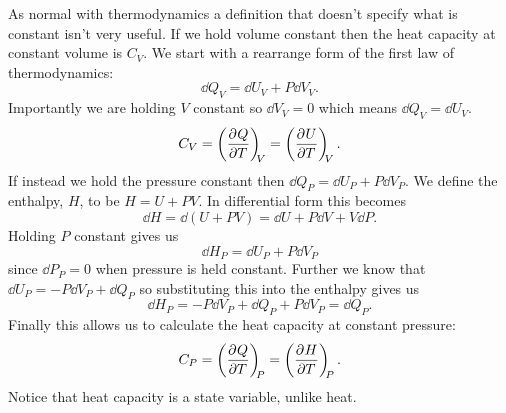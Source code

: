     As normal with thermodynamics a definition that doesn't specify what is constant isn't very useful.
    If we hold volume constant then the heat capacity at constant volume is \(C_V\).
    We start with a rearrange form of the first law of thermodynamics:
    \[\dd{Q_V} = \dd{U_V} + P\dd{V_V}.\]
    Importantly we are holding \(V\) constant so \(\dd{V_V} = 0\) which means \(\dd{Q_V} = \dd{U_V}\).
    \[C_V = \left(\pdv[]{Q}{T}\right)_{\!\!{V}} = \left(\pdv[]{U}{T}\right)_{\!\!{V}}.\]
    If instead we hold the pressure constant then \(\dd{Q_P} = \dd{U_P} + P\dd{V_P}\).
    We define the enthalpy, \(H\), to be \(H = U + PV\).
    In differential form this becomes
    \[\dd{H} = \dd{(U + PV)} = \dd{U} + P\dd{V} + V\dd{P}.\]
    Holding \(P\) constant gives us
    \[\dd{H_P} = \dd{U_P} + P\dd{V_P}\]
    since \(\dd{P_P} = 0\) when pressure is held constant.
    Further we know that \(\dd{U_P} = -P\dd{V_P} + \dd{Q_P}\) so substituting this into the enthalpy gives us
    \[\dd{H_P} = -P\dd{V_P} + \dd{Q_P} + P\dd{V_P} = \dd{Q_P}.\]
    Finally this allows us to calculate the heat capacity at constant pressure:
    \[C_P = \left(\pdv[]{Q}{T}\right)_{\!\!{P}} = \left(\pdv[]{H}{T}\right)_{\!\!{P}}.\]
    Notice that heat capacity is a state variable, unlike heat.
    
